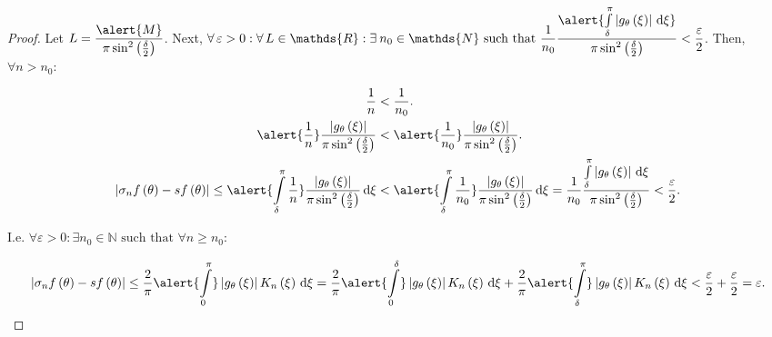 \begin{frame}
	\begin{proof}
		Let
		\begin{math}
			L=
			\dfrac{
				\alert{M}
			}{
				\pi\sin^{2}\left(\frac{\delta}{2}\right)
			}
		\end{math}.
		Next,
		\begin{math}
			\displaystyle
			\forall\varepsilon>0:
			\forall L\in\mathds{R}:
			\exists n_{0}\in\mathds{N}
			\text{ such that }
			\frac{1}{n_{0}}
			\frac{
			\alert{
			\int\limits_{\delta}^{\pi}
			\left|g_{\theta}\left(\xi\right)\right|
			\dl\xi}
			}{\pi\sin^{2}\left(\frac{\delta}{2}\right)}
			<\frac{\varepsilon}{2}
		\end{math}.
		Then, $\forall n>n_{0}$:

		\begin{align*}
			\frac{1}{n}                                 & <
			\frac{1}{n_{0}}.                                \\
			\alert{\frac{1}{n}}
			\frac{
				\left|
				g_{\theta}\left(\xi\right)
				\right|
			}{\pi\sin^{2}\left(\frac{\delta}{2}\right)} & <
			\alert{\frac{1}{n_{0}}}
			\frac{
				\left|
				g_{\theta}\left(\xi\right)
				\right|
			}{\pi\sin^{2}\left(\frac{\delta}{2}\right)}.    \\
			\left|
			\sigma_{n}f\left(\theta\right)-
			sf\left(\theta\right)
			\right|\leq
			\alert{
				\int\limits_{\delta}^{\pi}
				\frac{1}{n}
			}
			\frac{
				\left|
				g_{\theta}\left(\xi\right)
				\right|
			}{
				\pi\sin^{2}\left(\frac{\delta}{2}\right)
			}
			\dl\xi
			                                            & <
			\alert{
				\int\limits_{\delta}^{\pi}
				\frac{1}{n_{0}}
			}
			\frac{
			\left|g_{\theta}\left(\xi\right)\right|
			}{\pi\sin^{2}\left(\frac{\delta}{2}\right)}
			\dl\xi=
			\frac{1}{n_{0}}
			\frac{
			\int\limits_{\delta}^{\pi}
			\left|g_{\theta}\left(\xi\right)\right|
			\dl\xi
			}{\pi\sin^{2}\left(\frac{\delta}{2}\right)}
			<\frac{\varepsilon}{2}.
		\end{align*}

		I.e.
		\begin{math}
			\forall\varepsilon>0:
			\exists n_{0}\in\mathds{N}
			\text{ such that }
			\forall n\geq n_{0}:
		\end{math}

		\begin{equation*}
			\left|
			\sigma_{n}f\left(\theta\right)-
			sf\left(\theta\right)
			\right|
			\leq
			\frac{2}{\pi}
			\alert{\int\limits_{0}^{\pi}}
			\left|
			g_{\theta}\left(\xi\right)
			\right|
			K_{n}\left(\xi\right)
			\dl\xi
			=
			\frac{2}{\pi}
			\alert{\int\limits_{0}^{\delta}}
			\left|
			g_{\theta}\left(\xi\right)
			\right|
			K_{n}\left(\xi\right)
			\dl\xi
			+
			\frac{2}{\pi}
			\alert{\int\limits_{\delta}^{\pi}}
			\left|
			g_{\theta}\left(\xi\right)
			\right|
			K_{n}\left(\xi\right)
			\dl\xi
			<\frac{\varepsilon}{2}+
			\frac{\varepsilon}{2}=
			\varepsilon.
		\end{equation*}
	\end{proof}
\end{frame}

